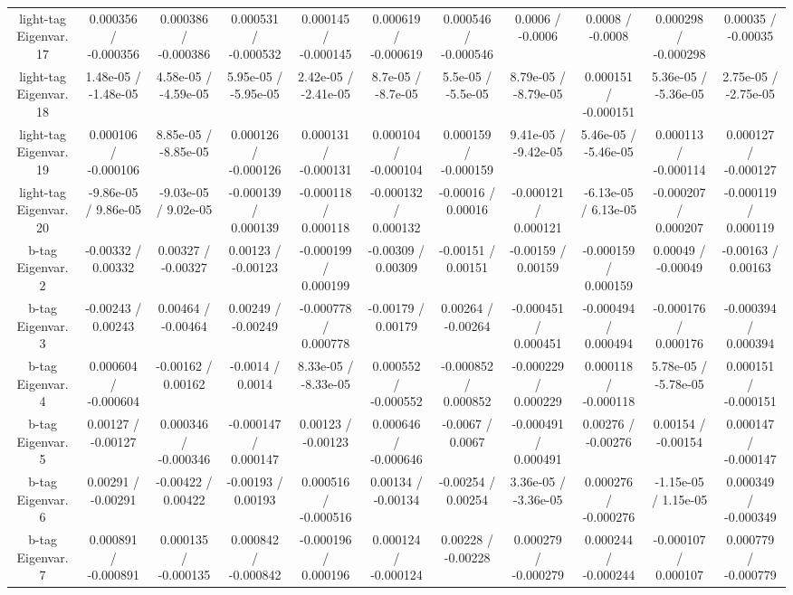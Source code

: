 \begin{table}[htbp]
\begin{center}
\begin{tabular}{|c|c|c|c|c|c|c|c|c|c|c|}
  light-tag Eigenvar. 17 & 0.000356 / -0.000356 & 0.000386 / -0.000386 & 0.000531 / -0.000532 & 0.000145 / -0.000145 & 0.000619 / -0.000619 & 0.000546 / -0.000546 & 0.0006 / -0.0006 & 0.0008 / -0.0008 & 0.000298 / -0.000298 & 0.00035 / -0.00035 \\ 
  light-tag Eigenvar. 18 & 1.48e-05 / -1.48e-05 & 4.58e-05 / -4.59e-05 & 5.95e-05 / -5.95e-05 & 2.42e-05 / -2.41e-05 & 8.7e-05 / -8.7e-05 & 5.5e-05 / -5.5e-05 & 8.79e-05 / -8.79e-05 & 0.000151 / -0.000151 & 5.36e-05 / -5.36e-05 & 2.75e-05 / -2.75e-05 \\ 
  light-tag Eigenvar. 19 & 0.000106 / -0.000106 & 8.85e-05 / -8.85e-05 & 0.000126 / -0.000126 & 0.000131 / -0.000131 & 0.000104 / -0.000104 & 0.000159 / -0.000159 & 9.41e-05 / -9.42e-05 & 5.46e-05 / -5.46e-05 & 0.000113 / -0.000114 & 0.000127 / -0.000127 \\ 
  light-tag Eigenvar. 20 & -9.86e-05 / 9.86e-05 & -9.03e-05 / 9.02e-05 & -0.000139 / 0.000139 & -0.000118 / 0.000118 & -0.000132 / 0.000132 & -0.00016 / 0.00016 & -0.000121 / 0.000121 & -6.13e-05 / 6.13e-05 & -0.000207 / 0.000207 & -0.000119 / 0.000119 \\ 
  b-tag Eigenvar. 2 & -0.00332 / 0.00332 & 0.00327 / -0.00327 & 0.00123 / -0.00123 & -0.000199 / 0.000199 & -0.00309 / 0.00309 & -0.00151 / 0.00151 & -0.00159 / 0.00159 & -0.000159 / 0.000159 & 0.00049 / -0.00049 & -0.00163 / 0.00163 \\ 
  b-tag Eigenvar. 3 & -0.00243 / 0.00243 & 0.00464 / -0.00464 & 0.00249 / -0.00249 & -0.000778 / 0.000778 & -0.00179 / 0.00179 & 0.00264 / -0.00264 & -0.000451 / 0.000451 & -0.000494 / 0.000494 & -0.000176 / 0.000176 & -0.000394 / 0.000394 \\ 
  b-tag Eigenvar. 4 & 0.000604 / -0.000604 & -0.00162 / 0.00162 & -0.0014 / 0.0014 & 8.33e-05 / -8.33e-05 & 0.000552 / -0.000552 & -0.000852 / 0.000852 & -0.000229 / 0.000229 & 0.000118 / -0.000118 & 5.78e-05 / -5.78e-05 & 0.000151 / -0.000151 \\ 
  b-tag Eigenvar. 5 & 0.00127 / -0.00127 & 0.000346 / -0.000346 & -0.000147 / 0.000147 & 0.00123 / -0.00123 & 0.000646 / -0.000646 & -0.0067 / 0.0067 & -0.000491 / 0.000491 & 0.00276 / -0.00276 & 0.00154 / -0.00154 & 0.000147 / -0.000147 \\ 
  b-tag Eigenvar. 6 & 0.00291 / -0.00291 & -0.00422 / 0.00422 & -0.00193 / 0.00193 & 0.000516 / -0.000516 & 0.00134 / -0.00134 & -0.00254 / 0.00254 & 3.36e-05 / -3.36e-05 & 0.000276 / -0.000276 & -1.15e-05 / 1.15e-05 & 0.000349 / -0.000349 \\ 
  b-tag Eigenvar. 7 & 0.000891 / -0.000891 & 0.000135 / -0.000135 & 0.000842 / -0.000842 & -0.000196 / 0.000196 & 0.000124 / -0.000124 & 0.00228 / -0.00228 & 0.000279 / -0.000279 & 0.000244 / -0.000244 & -0.000107 / 0.000107 & 0.000779 / -0.000779 \\ 

\end{tabular}
\end{center}
\end{table}
